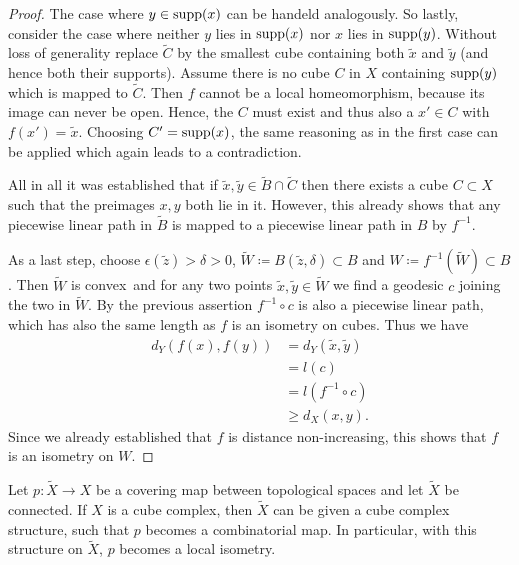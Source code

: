 \begin{proof}
  The case where \(y \in \operatorname{supp}(x)\) can be handeld analogously. So lastly, consider the case where neither \(y\) lies in \(\operatorname{supp}(x)\) nor \(x\) lies in \(\operatorname{supp}(y)\). Without loss of generality replace \(\tilde C\) by the smallest cube containing both \(\tilde x\) and \(\tilde y\) (and hence both their supports). Assume there is no cube \(C\) in \(X\) containing \(\operatorname{supp}(y)\) which is mapped to \(\tilde C\). Then \(f\) cannot be a local homeomorphism, because its image can never be open. Hence, the \(C\) must exist and thus also a \(x' \in C\) with \(f(x') = \tilde x\). Choosing \(C' = \operatorname{supp}(x)\), the same reasoning as in the first case can be applied which again leads to a contradiction.

  All in all it was established that if \(\tilde x, \tilde y \in \tilde B \cap \tilde C\) then there exists a cube \(C \subset X\) such that the preimages \(x, y\) both lie in it. However, this already shows that any piecewise linear path in \(\tilde B\) is mapped to a piecewise linear path in \(B\) by \(f^{-1}\).

  As a last step, choose \(\epsilon(\tilde z) > \delta > 0\), \(\tilde W \coloneqq B(\tilde z, \delta) \subset B\) and \(W \coloneqq f^{-1}(\tilde W) \subset B\). Then \(\tilde W\) is convex\ and for any two points \(\tilde x, \tilde y \in \tilde W\) we find a geodesic \(c\) joining the two in \(\tilde W\). By the previous assertion \(f^{-1} \circ c\) is also a piecewise linear path, which has also the same length as \(f\) is an isometry on cubes. Thus we have
  \begin{align*}
    d_Y(f(x), f(y))
    & = d_Y(\tilde x, \tilde y)\\
    & = l(c)\\
    & = l(f^{-1} \circ c)\\
    & \geq d_X(x,y).
  \end{align*}
  Since we already established that \(f\) is distance non-increasing, this shows that \(f\) is an isometry on \(W\).
\end{proof}

\begin{prop}
  \label{prop:covering}
  Let \(p \colon \tilde X \to X\) be a covering map between topological spaces and let \(\tilde X\) be connected. If \(X\) is a cube complex, then \(\tilde X\) can be given a cube complex structure, such that \(p\) becomes a combinatorial map. In particular, with this structure on \(\tilde X\), \(p\) becomes a local isometry.
\end{prop}

